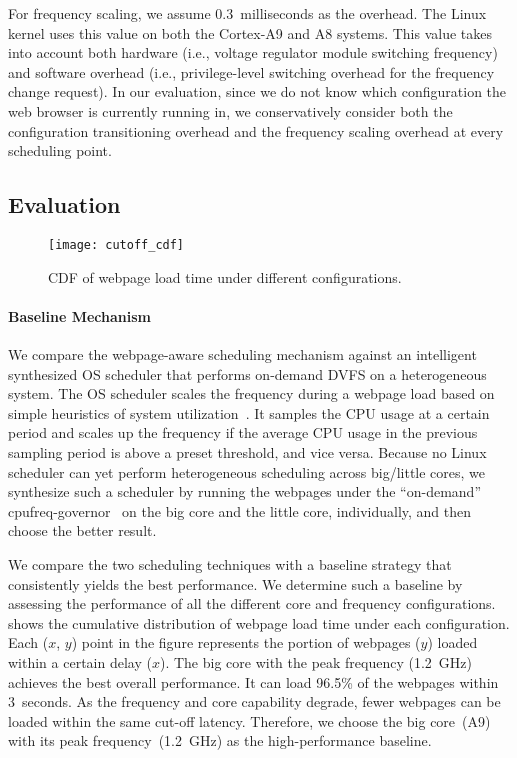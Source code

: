For frequency scaling, we assume 0.3~milliseconds as the overhead. The Linux kernel uses this value on both the Cortex-A9 and A8 systems. This value takes into account both hardware (i.e., voltage regulator module switching frequency) and software overhead (i.e., privilege-level switching overhead for the frequency change request). In our evaluation, since we do not know which configuration the web browser is currently running in, we conservatively consider both the configuration transitioning overhead and the frequency scaling overhead at every scheduling point.

\subsection{Evaluation}
\label{sec:runtime:load:eval}

\begin{figure}[t]
\centering
\texttt{[image: cutoff\_cdf]}
\caption{CDF of webpage load time under different configurations.}
\label{fig:cutoff_cdf}
\end{figure}

\paragraph{Baseline Mechanism} We compare the webpage-aware scheduling mechanism against an intelligent synthesized OS scheduler that performs on-demand DVFS on a heterogeneous system. The OS scheduler scales the frequency during a webpage load based on simple heuristics of system utilization~\cite{OS_DVFS1,OS_DVFS2}. It samples the CPU usage at a certain period and scales up the frequency if the average CPU usage in the previous sampling period is above a preset threshold, and vice versa. Because no Linux scheduler can yet perform heterogeneous scheduling across big/little cores, we synthesize such a scheduler by running the webpages under the ``on-demand'' cpufreq-governor~\cite{ondemand} on the big core and the little core, individually, and then choose the better result.

We compare the two scheduling techniques with a baseline strategy that consistently yields the best performance. We determine such a baseline by assessing the performance of all the different core and frequency configurations.  shows the cumulative distribution of webpage load time under each configuration. Each ($x$, $y$) point in the figure represents the portion of webpages ($y$) loaded within a certain delay ($x$). The big core with the peak frequency (1.2~GHz) achieves the best overall performance. It can load 96.5\% of the webpages within 3~seconds. As the frequency and core capability degrade, fewer webpages can be loaded within the same cut-off latency. Therefore, we choose the big core~(A9) with its peak frequency~(1.2~GHz) as the high-performance baseline.

